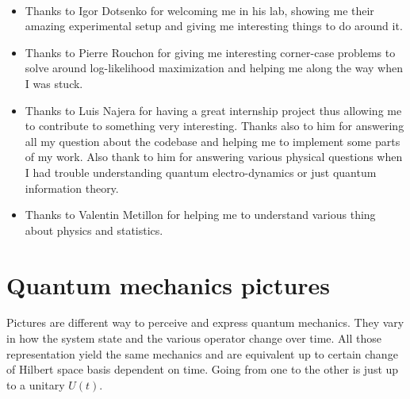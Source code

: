 \documentclass[10pt,a4paper]{report}
\theoremstyle{plain}
\theoremstyle{definition}
\theoremstyle{remark}
\begin{document}
\

\vspace{1.3cm}

\begin{itemize}

\item Thanks to Igor Dotsenko for welcoming me in his lab, showing me their
  amazing experimental setup and giving me interesting things to do around it.\\
\item Thanks to Pierre Rouchon for giving me interesting corner-case problems to solve
  around log-likelihood maximization and helping me along the way when I was stuck.\\
\item Thanks to Luis Najera for having a great internship project thus allowing
  me to contribute to something very interesting. Thanks also to
  him for answering all my question about the codebase and helping me to
  implement some parts of my work. Also thank to him for answering various
  physical questions when I had trouble understanding quantum electro-dynamics or
  just quantum information theory.\\
\item Thanks to Valentin Metillon for helping me to understand various thing
  about physics and statistics.
\end{itemize}


\vfill








\appendix

\chapter{Quantum mechanics pictures}\label{app:pict}

Pictures are different way to perceive and express quantum mechanics. They vary
in how the system state and the various operator change over time. All those
representation yield the same mechanics and are equivalent up to certain change
of Hilbert space basis dependent on time. Going from one to the other is just up
to a unitary $U(t)$.
\end{document}
